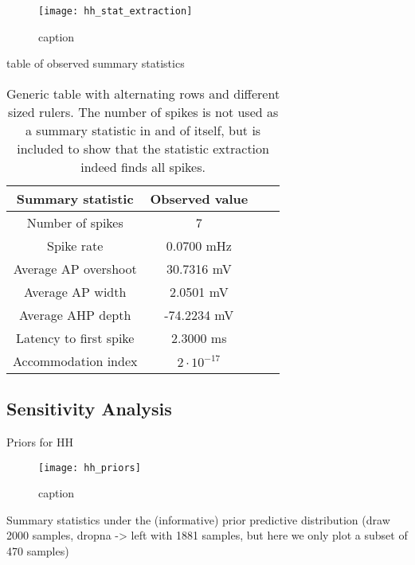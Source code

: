 \begin{figure}[H]
    \centering
    \texttt{[image: hh\_stat\_extraction]}
    \caption{caption}
    \label{fig:fig1}
\end{figure} 

table of observed summary statistics 

\begin{table}[H]
  \caption{Generic table with alternating rows and different sized rulers. The number of spikes is not used as a summary statistic in and of itself, but is included to show that the statistic extraction indeed finds all spikes.}
  \begin{center}
    \begin{tabular}{cccc}
      \toprule
      \textbf{Summary statistic} & \textbf{Observed value} \\
      \midrule
      Number of spikes &  7 \\
      Spike rate &  0.0700 mHz \\
      Average AP overshoot & 30.7316 mV  \\
      Average AP width &  2.0501 mV \\
      Average AHP depth & -74.2234 mV \\
      Latency to first spike & 2.3000 ms \\
      Accommodation index &  $2 \cdot 10^{-17}$ \\
      \bottomrule
    \end{tabular}
  \end{center}
  \label{tab:hh_obs_sumstats}
\end{table}


\subsection{Sensitivity Analysis}

Priors for HH

\begin{figure}[H]
    \centering
    \texttt{[image: hh\_priors]}
    \caption{caption}
    \label{fig:fig1}
\end{figure} 


Summary statistics under the (informative) prior predictive distribution (draw 2000 samples, dropna -> left with 1881 samples, but here we only plot a subset of 470 samples)

